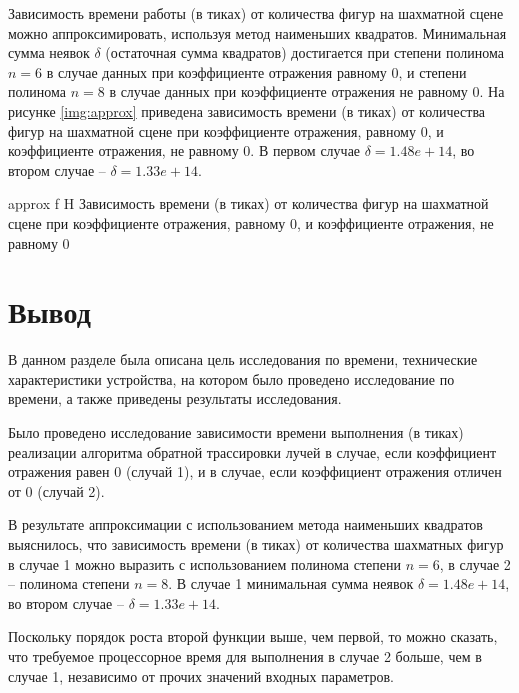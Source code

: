 Зависимость времени работы (в тиках) от количества фигур на шахматной сцене можно аппроксимировать, используя метод наименьших квадратов. Минимальная сумма неявок $\delta$ (остаточная сумма квадратов) достигается при степени полинома $n = 6$ в случае данных при коэффициенте отражения равному 0, и степени полинома $n = 8$ в случае данных при коэффициенте отражения не равному 0. На рисунке \ref{img:approx} приведена зависимость времени (в тиках) от количества фигур на шахматной сцене при коэффициенте отражения, равному 0, и коэффициенте отражения, не равному 0. В первом случае $\delta = 1.48e+14$, во втором случае -- $\delta = 1.33e+14$.

{approx} 
{f} 
{H} 
{\textwidth} 
{Зависимость времени (в тиках) от количества фигур на шахматной сцене при коэффициенте отражения, равному 0, и коэффициенте отражения, не равному 0}

\section*{Вывод}

В данном разделе была описана цель исследования по времени, технические характеристики устройства, на котором было проведено исследование по времени, а также приведены результаты исследования.

Было проведено исследование зависимости времени выполнения (в тиках) реализации алгоритма обратной трассировки лучей в случае, если коэффициент отражения равен 0 (случай 1), и в случае, если коэффициент отражения отличен от 0 (случай 2). 

В результате аппроксимации с использованием метода наименьших квадратов выяснилось, что зависимость времени (в тиках) от количества шахматных фигур в случае 1 можно выразить с использованием полинома степени $n = 6$, в случае 2 -- полинома степени $n = 8$. В случае 1 минимальная сумма неявок $\delta = 1.48e+14$, во втором случае -- $\delta = 1.33e+14$.

Поскольку порядок роста второй функции выше, чем первой, то можно сказать, что требуемое процессорное время для выполнения в случае 2 больше, чем в случае 1, независимо от прочих значений входных параметров.

